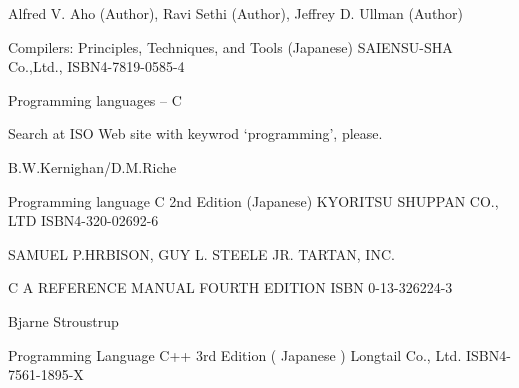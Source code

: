 \begin{thebibliography}{10}

Alfred V. Aho (Author), Ravi Sethi (Author), Jeffrey D. Ullman (Author) 

\newblock Compilers: Principles, Techniques, and Tools (Japanese) 
\newblock SAIENSU-SHA Co.,Ltd., ISBN4-7819-0585-4

Programming languages -- C

\newblock Search at ISO Web site with keywrod `programming', please.

B.W.Kernighan/D.M.Riche

\newblock Programming language C 2nd Edition (Japanese)
\newblock KYORITSU SHUPPAN CO., LTD ISBN4-320-02692-6

SAMUEL P.HRBISON, GUY L. STEELE JR. TARTAN, INC.

\newblock C A REFERENCE MANUAL FOURTH EDITION
\newblock ISBN 0-13-326224-3

Bjarne Stroustrup

\newblock Programming Language C++ 3rd Edition ( Japanese )
\newblock Longtail Co., Ltd. ISBN4-7561-1895-X

\end{thebibliography}

